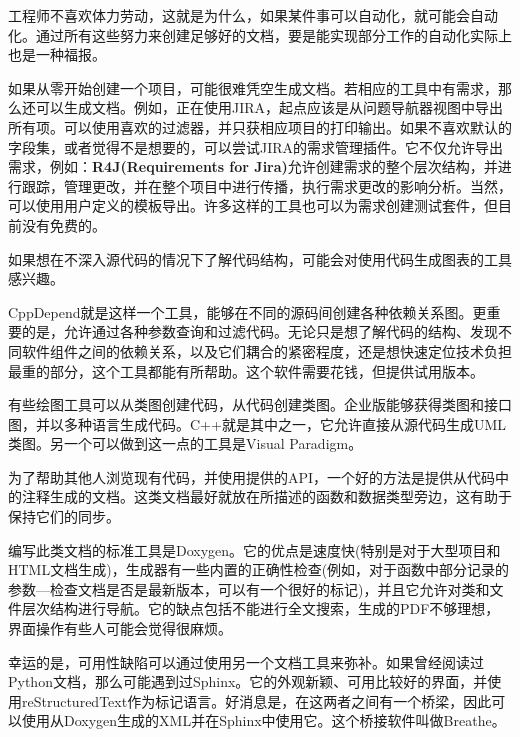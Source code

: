 
工程师不喜欢体力劳动，这就是为什么，如果某件事可以自动化，就可能会自动化。通过所有这些努力来创建足够好的文档，要是能实现部分工作的自动化实际上也是一种福报。


如果从零开始创建一个项目，可能很难凭空生成文档。若相应的工具中有需求，那么还可以生成文档。例如，正在使用JIRA，起点应该是从问题导航器视图中导出所有项。可以使用喜欢的过滤器，并只获相应项目的打印输出。如果不喜欢默认的字段集，或者觉得不是想要的，可以尝试JIRA的需求管理插件。它不仅允许导出需求，例如：\textbf{R4J(Requirements for Jira)}允许创建需求的整个层次结构，并进行跟踪，管理更改，并在整个项目中进行传播，执行需求更改的影响分析。当然，可以使用用户定义的模板导出。许多这样的工具也可以为需求创建测试套件，但目前没有免费的。


如果想在不深入源代码的情况下了解代码结构，可能会对使用代码生成图表的工具感兴趣。

CppDepend就是这样一个工具，能够在不同的源码间创建各种依赖关系图。更重要的是，允许通过各种参数查询和过滤代码。无论只是想了解代码的结构、发现不同软件组件之间的依赖关系，以及它们耦合的紧密程度，还是想快速定位技术负担最重的部分，这个工具都能有所帮助。这个软件需要花钱，但提供试用版本。

有些绘图工具可以从类图创建代码，从代码创建类图。企业版能够获得类图和接口图，并以多种语言生成代码。C++就是其中之一，它允许直接从源代码生成UML类图。另一个可以做到这一点的工具是Visual Paradigm。


为了帮助其他人浏览现有代码，并使用提供的API，一个好的方法是提供从代码中的注释生成的文档。这类文档最好就放在所描述的函数和数据类型旁边，这有助于保持它们的同步。

编写此类文档的标准工具是Doxygen。它的优点是速度快(特别是对于大型项目和HTML文档生成)，生成器有一些内置的正确性检查(例如，对于函数中部分记录的参数—检查文档是否是最新版本，可以有一个很好的标记)，并且它允许对类和文件层次结构进行导航。它的缺点包括不能进行全文搜索，生成的PDF不够理想，界面操作有些人可能会觉得很麻烦。

幸运的是，可用性缺陷可以通过使用另一个文档工具来弥补。如果曾经阅读过Python文档，那么可能遇到过Sphinx。它的外观新颖、可用比较好的界面，并使用reStructuredText作为标记语言。好消息是，在这两者之间有一个桥梁，因此可以使用从Doxygen生成的XML并在Sphinx中使用它。这个桥接软件叫做Breathe。

